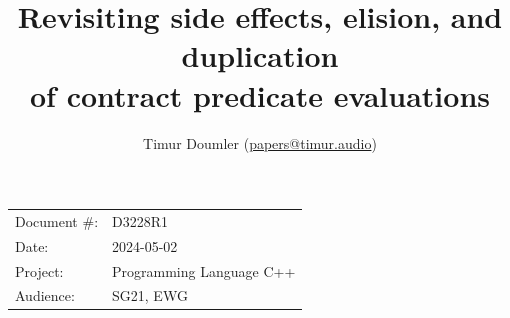 

 \usepackage[bottom]{footmisc} 

 \usepackage{longtable}


\usepackage{tikz,lipsum,lmodern}
\usepackage[most]{tcolorbox}



\usepackage{titlesec}
\usepackage{tocloft}


\newcommand{\changelocaltocdepth}[1]{%
  \addtocontents{toc}{\protect\setcounter{tocdepth}{#1}}%
  \setcounter{tocdepth}{#1}%
}

\setcounter{tocdepth}{3}



\title{Revisiting side effects, elision, and duplication \\ of contract predicate evaluations}
\author{ Timur Doumler \small(\href{mailto:papers@timur.audio}{papers@timur.audio}) 
}
\date{}
\maketitle

\begin{tabular}{ll}
Document \#: & D3228R1 \\
Date: &2024-05-02 \\
Project: & Programming Language C++ \\
Audience: & SG21, EWG
\end{tabular}


